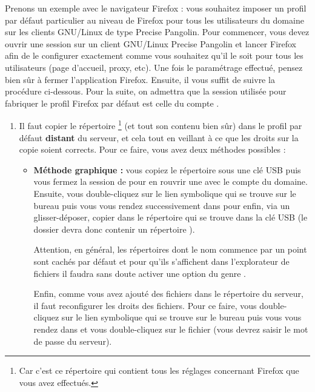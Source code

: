 Prenons un exemple avec le navigateur Firefox :
vous souhaitez imposer un profil par défaut particulier au niveau 
de Firefox pour tous les utilisateurs du domaine sur
les clients GNU/Linux de type Precise Pangolin.
Pour commencer, vous devez
ouvrir une session sur un client GNU/Linux Precise Pangolin
et lancer Firefox afin de le configurer exactement comme vous
souhaitez qu'il le soit pour tous les utilisateurs (page d'accueil,
proxy, etc).
Une fois le paramétrage effectué,
pensez bien sûr à fermer l'application Firefox. Ensuite, il vous
suffit de suivre la procédure ci-dessous.
Pour la suite, on admettra que la session utilisée pour fabriquer
le profil Firefox par défaut est celle du compte .
%
\begin{enumerate}
\item Il faut copier le répertoire %
%
\footnote{Car c'est ce répertoire qui contient tous les réglages
concernant Firefox que vous avez effectués.}
%
(et tout son contenu bien sûr)
dans le profil par défaut \textbf{distant} du serveur, et cela
tout en veillant à ce que les droits sur la copie soient corrects.
Pour ce faire, vous avez deux méthodes possibles :
%
\begin{itemize}

\item \textbf{Méthode graphique :} vous copiez le répertoire
 sous une clé USB puis vous fermez la
session de  pour en rouvrir une avec le compte 
du domaine. Ensuite, vous double-cliquez sur le lien symbolique
 qui se trouve sur le bureau puis vous
vous rendez successivement dans  \Vers {}
\Vers {} pour enfin, via un glisser-déposer,
copier dans 
le répertoire  qui se trouve dans la clé USB
(le dossier  devra
donc contenir un répertoire ).

Attention, en général, les répertoires dont le nom commence par un point
sont cachés par défaut et pour qu'ils s'affichent dans l'explorateur
de fichiers il faudra sans doute activer une option du genre
\og {} \fg{}.

Enfin, comme vous avez ajouté des fichiers dans le répertoire
 du serveur, il faut reconfigurer les droits
des fichiers. Pour ce faire, vous double-cliquez sur le lien symbolique
 qui se trouve sur le bureau puis vous
vous rendez dans  et vous double-cliquez sur
le fichier  (vous devrez saisir le mot de
passe  du serveur).



\end{itemize}
\end{enumerate}
